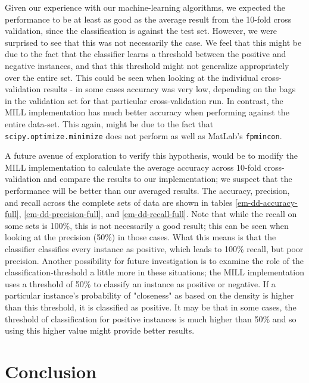 \documentclass[conference]{IEEEtran}
\begin{document}
Given our experience with our machine-learning algorithms, we expected the performance to be at least as good as the average result from the 10-fold cross validation, since the classification is against the test set. However, we were surprised to see that this was not necessarily the case. We feel that this might be due to the fact that the classifier learns a threshold between the positive and negative instances, and that this threshold might not generalize appropriately over the entire set. This could be seen when looking at the individual cross-validation results - in some cases accuracy was very low, depending on the bags in the validation set for that particular cross-validation run. In contrast, the MILL implementation has much better accuracy when performing against the entire data-set. This again, might be due to the fact that \texttt{scipy.optimize.minimize} does not perform as well as MatLab's \texttt{fpmincon}. 

A future avenue of exploration to verify this hypothesis, would be to modify the MILL implementation to calculate the average accuracy across 10-fold cross-validation and compare the results to our implementation; we suspect that the performance will be better than our averaged results. The accuracy, precision, and recall across the complete sets of data are shown in tables \ref{em-dd-accuracy-full}, \ref{em-dd-precision-full}, and \ref{em-dd-recall-full}. Note that while the recall on some sets is 100\%, this is not necessarily a good result; this can be seen when looking at the precision (50\%) in those cases. What this means is that the classifier classifies every instance as positive, which leads to 100\% recall, but poor precision. Another possibility for future investigation is to examine the role of the classification-threshold a little more in these situations; the MILL implementation uses a threshold of 50\% to classify an instance as positive or negative. If a particular instance's probability of "closeness" as based on the density is higher than this threshold, it is classified as positive. It may be that in some cases, the threshold of classification for positive instances is much higher than 50\% and so using this higher value might provide better results.


\section{Conclusion}
\end{document}
